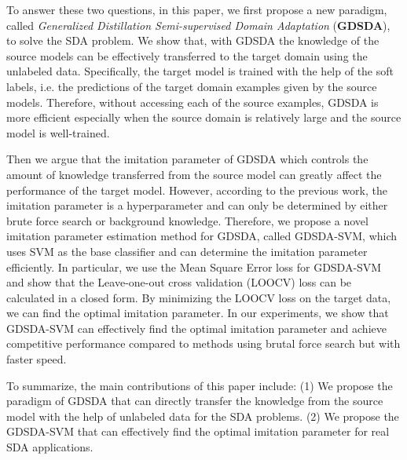 To answer these two questions, in this paper, we first propose a new paradigm, called \textit{Generalized Distillation Semi-supervised Domain Adaptation} (\textbf{GDSDA}), to solve the SDA problem. 
We show that, with GDSDA the knowledge of the source models can be effectively transferred to the target domain using the unlabeled data. Specifically, the target model is trained with the help of the soft labels, i.e. the predictions of the target domain examples given by the source models. Therefore, without accessing each of the source examples, GDSDA is more efficient especially when the source domain is relatively large and the source model is well-trained.

Then we argue that the imitation parameter of GDSDA which controls the amount of knowledge transferred from the source model can greatly affect the performance of the target model.
However, according to the previous work\mbox{\cite{lopez2015unifying,Tzeng_2015_ICCV}}, the imitation parameter is a hyperparameter and can only be determined by either brute force search or background knowledge. 
Therefore, we propose a novel imitation parameter estimation method for GDSDA, called GDSDA-SVM, which uses SVM as the base classifier and can determine the imitation parameter efficiently. In particular, we use the Mean Square Error loss for GDSDA-SVM and show that the Leave-one-out cross validation (LOOCV) loss can be calculated in a closed form. By minimizing the LOOCV loss on the target data, we can find the optimal imitation parameter. In our experiments, we show that GDSDA-SVM can effectively find the optimal imitation parameter and achieve competitive performance compared to methods using brutal force search but with faster speed. 

To summarize, the main contributions of this paper include: (1) We propose the paradigm of GDSDA that can directly transfer the knowledge from the source model with the help of unlabeled data for the SDA problems. (2) We propose the GDSDA-SVM that can effectively find the optimal imitation parameter for real SDA applications.

